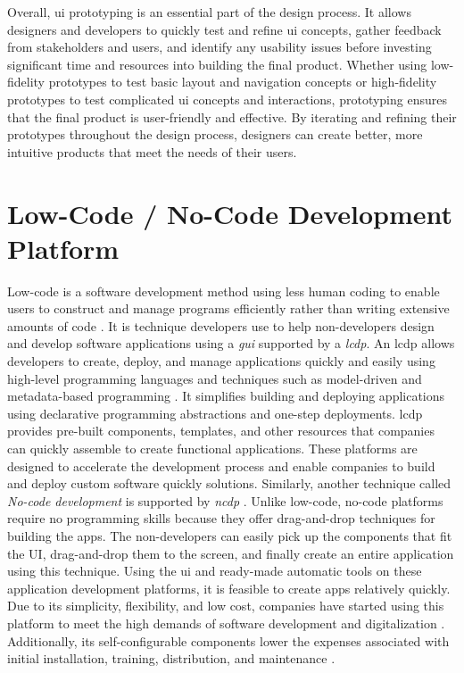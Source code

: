 Overall, \ac{ui} prototyping is an essential part of the design process. 
It allows designers and developers to quickly test and refine \ac{ui} concepts, gather feedback from stakeholders and users, and identify any usability issues before investing significant time and resources into building the final product. 
Whether using low-fidelity prototypes to test basic layout and navigation concepts or high-fidelity prototypes to test complicated \ac{ui} concepts and interactions, prototyping ensures that the final product is user-friendly and effective. 
By iterating and refining their prototypes throughout the design process, designers can create better, more intuitive products that meet the needs of their users. 
\clearpage


\section{Low-Code / No-Code Development Platform}
\label{background:section:lowcode}
Low-code is a software development method using less human coding to enable users to construct and manage programs efficiently rather than writing extensive amounts of code \cite{article:nocode:sahina}.
It is technique developers use to help non-developers design and develop software applications using a \textit{\ac{gui}} supported by a \textit{\ac{lcdp}}.
An \ac{lcdp} allows developers to create, deploy, and manage applications quickly and easily using high-level programming languages and techniques such as model-driven and metadata-based programming \cite{misc:lowcode:platforms}.
It simplifies building and deploying applications using declarative programming abstractions and one-step deployments.
\ac{lcdp} provides pre-built components, templates, and other resources that companies can quickly assemble to create functional applications.
These platforms are designed to accelerate the development process and enable companies to build and deploy custom software quickly solutions. 
Similarly, another technique called \textit{No-code development} is supported by \textit{\ac{ncdp}} \cite{article:nocode:miller}.
Unlike low-code, no-code platforms require no programming skills because they offer drag-and-drop techniques for building the apps.
The non-developers can easily pick up the components that fit the UI, drag-and-drop them to the screen, and finally create an entire application using this technique.
Using the \ac{ui} and ready-made automatic tools on these application development platforms, it is feasible to create apps relatively quickly. 
Due to its simplicity, flexibility, and low cost, companies have started using this platform to meet the high demands of software development and digitalization \cite{article:nocode:sahina}.
Additionally, its self-configurable components lower the expenses associated with initial installation, training, distribution, and maintenance \cite{article:nocode:sanchi}.

